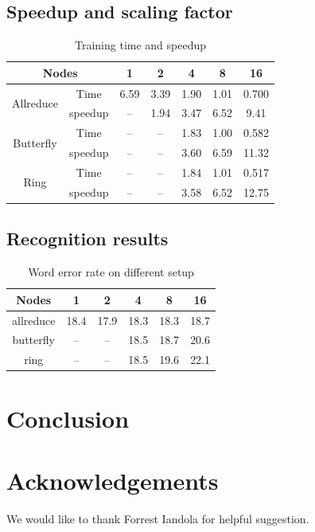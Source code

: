 \documentclass{article}
\begin{document}
\subsection{Speedup and scaling factor}
\begin{table}
  \centering
  \begin{tabular}{c|c|c|c|c|c|c}
    \hline
           \multicolumn{2}{c|}{Nodes}   & 1    & 2    & 4    & 8    & 16 \\
    \hline
\multirow{2}{*}{Allreduce} &    Time    & 6.59 & 3.39 & 1.90 & 1.01 & 0.700\\
                           &    speedup & --   & 1.94 & 3.47 & 6.52 & 9.41 \\
    \hline
\multirow{2}{*}{Butterfly} &    Time    & --   & --   & 1.83 & 1.00 & 0.582\\
                           &    speedup & --   & --   & 3.60 & 6.59 & 11.32\\
    \hline
\multirow{2}{*}{Ring}      &    Time    & --   & --   & 1.84 & 1.01 & 0.517\\
                           &    speedup & --   & --   & 3.58 & 6.52 & 12.75\\
    \hline
  \end{tabular}
  \caption{Training time and speedup}
\end{table}

\subsection{Recognition results}
\begin{table}
  \centering
  \begin{tabular}{c|c|c|c|c|c}
    \hline
    Nodes       & 1    & 2     & 4    & 8    & 16 \\
    \hline
    allreduce   & 18.4 & 17.9  & 18.3 & 18.3 & 18.7 \\
    butterfly   & --   & --    & 18.5 & 18.7 & 20.6 \\
    ring        & --   & --    & 18.5 & 19.6 & 22.1\\
    \hline
  \end{tabular}
  \caption{Word error rate on different setup}
\end{table}

\section{Conclusion}



\section{Acknowledgements}
We would like to thank Forrest Iandola for helpful suggestion.



\end{document}
